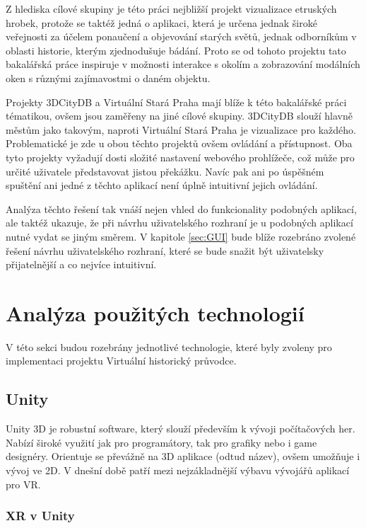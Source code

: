 \documentclass[thesis=B,czech]{FITthesis}[2012/06/26]
\begin{document}
  Z hlediska cílové skupiny je této práci nejbližší projekt vizualizace etruských hrobek, protože se taktéž jedná o aplikaci, která je určena jednak široké veřejnosti za účelem ponaučení a objevování starých světů, jednak odborníkům v oblasti historie, kterým zjednodušuje bádání. Proto se od tohoto projektu tato bakalářská práce inspiruje v možnosti interakce s okolím a zobrazování modálních oken s různými zajímavostmi o daném objektu.

 Projekty 3DCityDB a Virtuální Stará Praha mají blíže k této bakalářské práci tématikou, ovšem jsou zaměřeny na jiné cílové skupiny. 3DCityDB slouží hlavně městům jako takovým, naproti Virtuální Stará Praha je vizualizace pro každého. Problematické je zde u obou těchto projektů ovšem ovládání a přístupnost. Oba tyto projekty vyžadují dosti složité nastavení webového prohlížeče, což může pro určité uživatele představovat jistou překážku. Navíc pak ani po úspěšném spuštění ani jedné z těchto aplikací není úplně intuitivní jejich ovládání. 
 
 Analýza těchto řešení tak vnáší nejen vhled do funkcionality podobných aplikací, ale taktéž ukazuje, že při návrhu uživatelského rozhraní je u podobných aplikací nutné vydat se jiným směrem. V kapitole \ref{sec:GUI} bude blíže rozebráno zvolené řešení návrhu uživatelského rozhraní, které se bude snažit být uživatelsky přijatelnější a co nejvíce intuitivní.
	
	\section{Analýza použitých technologií}
	
	V této sekci budou rozebrány jednotlivé technologie, které byly zvoleny pro implementaci projektu Virtuální historický průvodce.

		\subsection{Unity}	
		
		Unity 3D je robustní software, který slouží především k vývoji počítačových her. Nabízí široké využití jak pro programátory, tak pro grafiky nebo i game designéry. Orientuje se převážně na 3D aplikace (odtud název), ovšem umožňuje i vývoj ve 2D. V dnešní době patří mezi nejzákladnější výbavu vývojářů aplikací pro VR.
		
		\subsubsection{XR v Unity}
		
\end{document}
